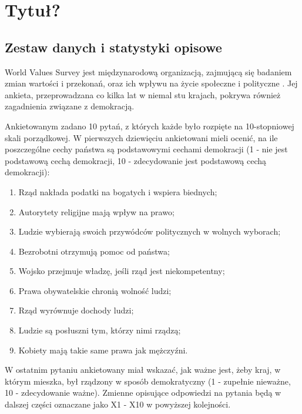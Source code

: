 \documentclass[12pt]{article}
\providecommand{\tightlist}{%
  \setlength{\itemsep}{0pt}\setlength{\parskip}{0pt}}
\begin{document}
\hypertarget{tytuux142}{%
\section{Tytuł?}\label{tytuux142}}

\hypertarget{zestaw-danych-i-statystyki-opisowe}{%
\subsection{Zestaw danych i statystyki opisowe}\label{zestaw-danych-i-statystyki-opisowe}}

World Values Survey jest międzynarodową organizacją, zajmującą się badaniem zmian wartości i przekonań, oraz ich wpływu na życie społeczne i polityczne \citep{WVSData}. Jej ankieta, przeprowadzana co kilka lat w niemal stu krajach, pokrywa również zagadnienia związane z demokracją.

Ankietowanym zadano 10 pytań, z których każde było rozpięte na 10-stopniowej skali porządkowej. W pierwszych dziewięciu ankietowani mieli ocenić, na ile poszczególne cechy państwa są podstawowymi cechami demokracji (1 - nie jest podstawową cechą demokracji, 10 - zdecydowanie jest podstawową cechą demokracji):

\begin{enumerate}
\def\labelenumi{\arabic{enumi}.}
\tightlist
\item
  Rząd nakłada podatki na bogatych i wspiera biednych;
\item
  Autorytety religijne mają wpływ na prawo;
\item
  Ludzie wybierają swoich przywódców politycznych w wolnych wyborach;
\item
  Bezrobotni otrzymują pomoc od państwa;
\item
  Wojsko przejmuje władzę, jeśli rząd jest niekompetentny;
\item
  Prawa obywatelskie chronią wolność ludzi;
\item
  Rząd wyrównuje dochody ludzi;
\item
  Ludzie są posłuszni tym, którzy nimi rządzą;
\item
  Kobiety mają takie same prawa jak mężczyźni.
\end{enumerate}

W ostatnim pytaniu ankietowany miał wskazać, jak ważne jest, żeby kraj, w którym mieszka, był rządzony w sposób demokratyczny (1 - zupełnie nieważne, 10 - zdecydowanie ważne). Zmienne opisujące odpowiedzi na pytania będą w dalszej części oznaczane jako X1 - X10 w powyższej kolejności.
\end{document}
